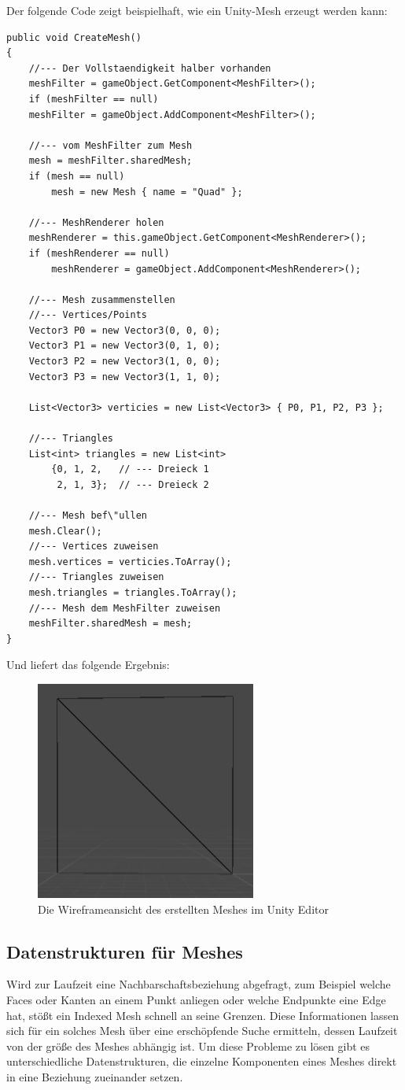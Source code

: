 Der folgende Code zeigt beispielhaft, wie ein Unity-Mesh erzeugt werden kann:
\begin{lstlisting}
public void CreateMesh()
{
	//--- Der Vollstaendigkeit halber vorhanden
	meshFilter = gameObject.GetComponent<MeshFilter>();
	if (meshFilter == null)
	meshFilter = gameObject.AddComponent<MeshFilter>();

	//--- vom MeshFilter zum Mesh
	mesh = meshFilter.sharedMesh;
	if (mesh == null)
		mesh = new Mesh { name = "Quad" };

	//--- MeshRenderer holen
	meshRenderer = this.gameObject.GetComponent<MeshRenderer>();
	if (meshRenderer == null)
		meshRenderer = gameObject.AddComponent<MeshRenderer>();

	//--- Mesh zusammenstellen
	//--- Vertices/Points
	Vector3 P0 = new Vector3(0, 0, 0);
	Vector3 P1 = new Vector3(0, 1, 0);
	Vector3 P2 = new Vector3(1, 0, 0);
	Vector3 P3 = new Vector3(1, 1, 0);

	List<Vector3> verticies = new List<Vector3> { P0, P1, P2, P3 };

	//--- Triangles
	List<int> triangles = new List<int> 
		{0, 1, 2, 	// --- Dreieck 1
		 2, 1, 3};	// --- Dreieck 2

	//--- Mesh bef\"ullen
	mesh.Clear();
	//--- Vertices zuweisen
	mesh.vertices = verticies.ToArray();
	//--- Triangles zuweisen
	mesh.triangles = triangles.ToArray();
	//--- Mesh dem MeshFilter zuweisen
	meshFilter.sharedMesh = mesh;
}
\end{lstlisting}

Und liefert das folgende Ergebnis:
\begin{figure}[h]
	\centering
	\includegraphics[width=0.35\linewidth]{Images/UnityQuadWireframe}
	\caption[Die Wireframeansicht des erstellten Meshes]{Die Wireframeansicht des erstellten Meshes im Unity Editor}
	\label{fig:unityquadwireframe}
\end{figure}

\subsection{Datenstrukturen f\"ur Meshes}
Wird zur Laufzeit eine Nachbarschaftsbeziehung abgefragt, zum Beispiel welche Faces oder Kanten an einem Punkt anliegen oder welche Endpunkte eine Edge hat, st\"o{\ss}t ein Indexed Mesh schnell an seine Grenzen. Diese Informationen lassen sich f\"ur ein solches Mesh \"uber eine ersch\"opfende Suche ermitteln, dessen Laufzeit von der gr\"o{\ss}e des Meshes abh\"angig ist. Um diese Probleme zu l\"osen gibt es unterschiedliche Datenstrukturen, die einzelne Komponenten eines Meshes direkt in eine Beziehung zueinander setzen.

